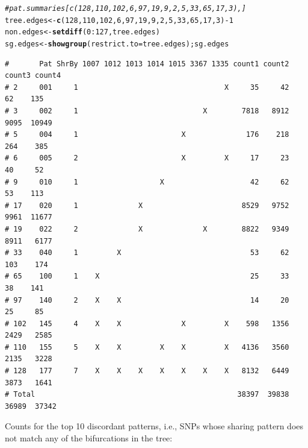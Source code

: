 \documentclass{article}\usepackage[]{graphicx}\usepackage[]{color}
\makeatletter
\newcommand{\hlnum}[1]{\textcolor[rgb]{0.686,0.059,0.569}{#1}}%
\newcommand{\hlcom}[1]{\textcolor[rgb]{0.678,0.584,0.686}{\textit{#1}}}%
\newcommand{\hlopt}[1]{\textcolor[rgb]{0,0,0}{#1}}%
\newcommand{\hlstd}[1]{\textcolor[rgb]{0.345,0.345,0.345}{#1}}%
\newcommand{\hlkwb}[1]{\textcolor[rgb]{0.69,0.353,0.396}{#1}}%
\newcommand{\hlkwc}[1]{\textcolor[rgb]{0.333,0.667,0.333}{#1}}%
\newcommand{\hlkwd}[1]{\textcolor[rgb]{0.737,0.353,0.396}{\textbf{#1}}}%
\newenvironment{kframe}{%
 \def\at@end@of@kframe{}%
 \ifinner\ifhmode%
  \def\at@end@of@kframe{\end{minipage}}%
  \begin{minipage}{\columnwidth}%
 \fi\fi%
 \def\FrameCommand##1{\hskip\@totalleftmargin \hskip-\fboxsep
 \colorbox{shadecolor}{##1}\hskip-\fboxsep
     \hskip-\linewidth \hskip-\@totalleftmargin \hskip\columnwidth}%
 \MakeFramed {\advance\hsize-\width
   \@totalleftmargin\z@ \linewidth\hsize
   \@setminipage}}%
 {\par\unskip\endMakeFramed%
 \at@end@of@kframe}
\newenvironment{knitrout}{}{} %
\makeatother
\begin{document}
\begin{knitrout}\scriptsize
{}\color{fgcolor}\begin{kframe}
\begin{alltt}
\hlcom{#pat.summaries[c(128,110,102,6,97,19,9,2,5,33,65,17,3),]}
\hlstd{tree.edges} \hlkwb{<-} \hlkwd{c}\hlstd{(}\hlnum{128}\hlstd{,}\hlnum{110}\hlstd{,}\hlnum{102}\hlstd{,}\hlnum{6}\hlstd{,}\hlnum{97}\hlstd{,}\hlnum{19}\hlstd{,}\hlnum{9}\hlstd{,}\hlnum{2}\hlstd{,}\hlnum{5}\hlstd{,}\hlnum{33}\hlstd{,}\hlnum{65}\hlstd{,}\hlnum{17}\hlstd{,}\hlnum{3}\hlstd{)}\hlopt{-}\hlnum{1}
\hlstd{non.edges} \hlkwb{<-} \hlkwd{setdiff}\hlstd{(}\hlnum{0}\hlopt{:}\hlnum{127}\hlstd{, tree.edges)}
\hlstd{sg.edges} \hlkwb{<-} \hlkwd{showgroup}\hlstd{(}\hlkwc{restrict.to}\hlstd{=tree.edges) ; sg.edges}
\end{alltt}
\begin{verbatim}
#       Pat ShrBy 1007 1012 1013 1014 1015 3367 1335 count1 count2 count3 count4
# 2     001     1                                  X     35     42     62    135
# 3     002     1                             X        7818   8912   9095  10949
# 5     004     1                        X              176    218    264    385
# 6     005     2                        X         X     17     23     40     52
# 9     010     1                   X                    42     62     53    113
# 17    020     1              X                       8529   9752   9961  11677
# 19    022     2              X              X        8822   9349   8911   6177
# 33    040     1         X                              53     62    103    174
# 65    100     1    X                                   25     33     38    141
# 97    140     2    X    X                              14     20     25     85
# 102   145     4    X    X              X         X    598   1356   2429   2585
# 110   155     5    X    X         X    X         X   4136   3560   2135   3228
# 128   177     7    X    X    X    X    X    X    X   8132   6449   3873   1641
# Total                                               38397  39838  36989  37342
\end{verbatim}
\end{kframe}
\end{knitrout}

Counts for the top 10 discordant patterns, i.e., SNPs whose sharing pattern does not match any of the bifurcations in the tree:
\end{document}
